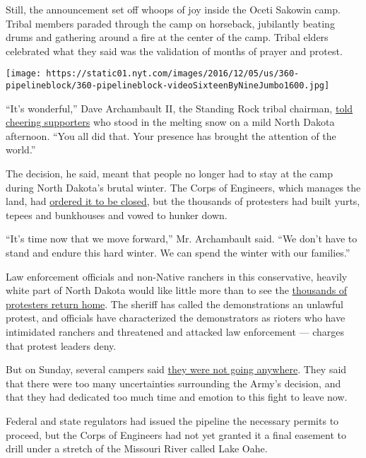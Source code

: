 Still, the announcement set off whoops of joy inside the Oceti Sakowin
camp. Tribal members paraded through the camp on horseback, jubilantly
beating drums and gathering around a fire at the center of the camp.
Tribal elders celebrated what they said was the validation of months of
prayer and protest.

\texttt{[image: https://static01.nyt.com/images/2016/12/05/us/360-pipelineblock/360-pipelineblock-videoSixteenByNineJumbo1600.jpg]}

``It's wonderful,'' Dave Archambault II, the Standing Rock tribal
chairman,
\href{http://www.nytimes.com/2016/12/03/us/standing-rock-pipeline-protest-north-dakota.html}{told
cheering supporters} who stood in the melting snow on a mild North
Dakota afternoon. ``You all did that. Your presence has brought the
attention of the world.''

The decision, he said, meant that people no longer had to stay at the
camp during North Dakota's brutal winter. The Corps of Engineers, which
manages the land, had
\href{http://www.nytimes.com/2016/11/26/us/dakota-pipeline-protest.html}{ordered
it to be closed}, but the thousands of protesters had built yurts,
tepees and bunkhouses and vowed to hunker down.

``It's time now that we move forward,'' Mr. Archambault said. ``We don't
have to stand and endure this hard winter. We can spend the winter with
our families.''

Law enforcement officials and non-Native ranchers in this conservative,
heavily white part of North Dakota would like little more than to see
the
\href{http://www.nytimes.com/2016/09/14/us/north-dakota-pipeline-protests.html}{thousands
of protesters return home}. The sheriff has called the demonstrations an
unlawful protest, and officials have characterized the demonstrators as
rioters who have intimidated ranchers and threatened and attacked law
enforcement --- charges that protest leaders deny.

But on Sunday, several campers said
\href{http://www.nytimes.com/2016/10/11/us/tribes-protest-oil-pipeline-north-dakota.html}{they
were not going anywhere}. They said that there were too many
uncertainties surrounding the Army's decision, and that they had
dedicated too much time and emotion to this fight to leave now.

Federal and state regulators had issued the pipeline the necessary
permits to proceed, but the Corps of Engineers had not yet granted it a
final easement to drill under a stretch of the Missouri River called
Lake Oahe.

